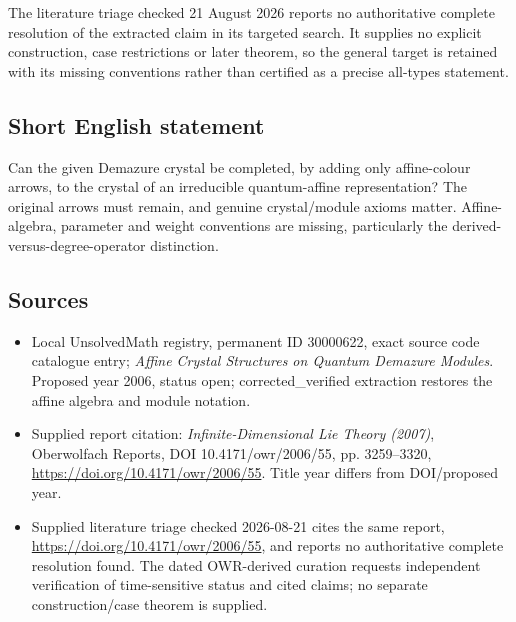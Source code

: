 \documentclass[11pt]{article}
\begin{document}
The literature triage checked 21 August 2026 reports no authoritative complete resolution of the extracted claim in its targeted search. It supplies no explicit construction, case restrictions or later theorem, so the general target is retained with its missing conventions rather than certified as a precise all-types statement.
\subsection{Short English statement}
Can the given Demazure crystal be completed, by adding only affine-colour arrows, to the crystal of an irreducible quantum-affine representation? The original arrows must remain, and genuine crystal/module axioms matter. Affine-algebra, parameter and weight conventions are missing, particularly the derived-versus-degree-operator distinction.
\subsection{Sources}
\begin{itemize}
\item Local UnsolvedMath registry, permanent ID 30000622, exact source code catalogue entry; \emph{Affine Crystal Structures on Quantum Demazure Modules}. Proposed year 2006, status open; corrected\_verified extraction restores the affine algebra and module notation.
\item Supplied report citation: \emph{Infinite-Dimensional Lie Theory (2007)}, Oberwolfach Reports, DOI 10.4171/owr/2006/55, pp. 3259--3320, \url{https://doi.org/10.4171/owr/2006/55}. Title year differs from DOI/proposed year.
\item Supplied literature triage checked 2026-08-21 cites the same report, \url{https://doi.org/10.4171/owr/2006/55}, and reports no authoritative complete resolution found. The dated OWR-derived curation requests independent verification of time-sensitive status and cited claims; no separate construction/case theorem is supplied.
\end{itemize}
\end{document}
